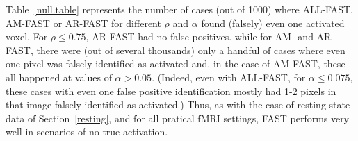 \begin{table}[h]
{              }   
\end{table}
Table~\ref{null.table} represents the number  
of cases (out of 1000) where ALL-FAST, AM-FAST or AR-FAST for different
$\rho$ and $\alpha$  
found (falsely) even one activated voxel. For $\rho \leq 0.75$,
AR-FAST had no false positives. while for AM- and AR-FAST, there
were (out of several thousands) only a handful of cases where even one
pixel was falsely identified as activated and, in the case of AM-FAST,
these all happened at values of $\alpha >0.05$.
(Indeed, even with ALL-FAST, for $\alpha\leq 0.075$, these cases
with even one false positive identification mostly had 1-2 pixels in
that image falsely identified as activated.) 
 Thus, as with the case of resting state data of Section~\ref{resting}, and for all pratical
 fMRI settings, FAST performs very well
 in scenarios of no true activation. 

